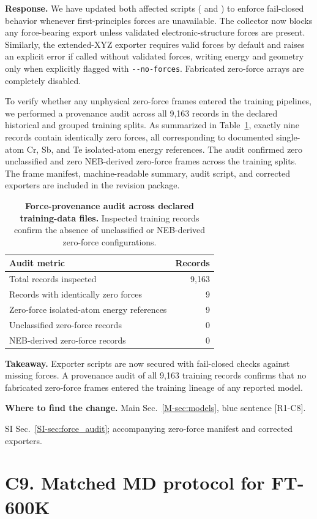 \documentclass[11pt]{article}
\newcommand{\location}[2]{\par{\small\textbf{Where to find the change.} #1\par #2}\par}
\begin{document}
\textbf{Response.} 
We have updated both affected scripts ( and ) to enforce fail-closed behavior whenever first-principles forces are unavailable. The collector now blocks any force-bearing export unless validated electronic-structure forces are present. Similarly, the extended-XYZ exporter requires valid forces by default and raises an explicit error if called without validated forces, writing energy and geometry only when explicitly flagged with \texttt{-{}-no-forces}. Fabricated zero-force arrays are completely disabled.

To verify whether any unphysical zero-force frames entered the training pipelines, we performed a provenance audit across all 9,163 records in the declared historical and grouped training splits. As summarized in Table~\ref{tab:resp-c8-force-audit}, exactly nine records contain identically zero forces, all corresponding to documented single-atom Cr, Sb, and Te isolated-atom energy references. The audit confirmed zero unclassified and zero NEB-derived zero-force frames across the training splits. The frame manifest, machine-readable summary, audit script, and corrected exporters are included in the revision package.

\begin{table}[!htbp]
\centering\small
\caption{\textbf{Force-provenance audit across declared training-data files.} Inspected training records confirm the absence of unclassified or NEB-derived zero-force configurations.}
\label{tab:resp-c8-force-audit}
\begin{tabular}{lr}
\toprule
Audit metric & Records \\
\midrule
Total records inspected & 9,163 \\
Records with identically zero forces & 9 \\
Zero-force isolated-atom energy references & 9 \\
Unclassified zero-force records & 0 \\
NEB-derived zero-force records & 0 \\
\bottomrule
\end{tabular}
\end{table}

\textbf{Takeaway.} Exporter scripts are now secured with fail-closed checks against missing forces. A provenance audit of all 9,163 training records confirms that no fabricated zero-force frames entered the training lineage of any reported model.
\location{Main Sec.~\ref{M-sec:models}, blue sentence [R1-C8].}{SI Sec.~\ref{SI-sec:force_audit}; accompanying zero-force manifest and corrected exporters.}
\section*{C9. Matched MD protocol for FT-600K}
\end{document}
